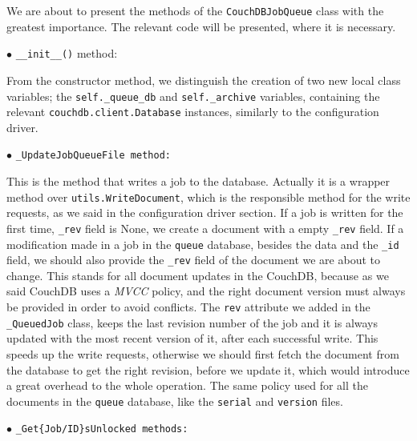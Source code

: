\begin{description}
    We are about to present the methods of the \texttt{CouchDBJobQueue} class
    with the greatest importance. The relevant code will be presented, where it
    is necessary.

    \bigskip
    $\bullet$ {\Large{\texttt{\_\_init\_\_()} method:}}

    From the constructor method, we distinguish the creation of two new local
    class variables; the \texttt{self.\_queue\_db} and \texttt{self.\_archive}
    variables, containing the relevant \texttt{couchdb.client.Database}
    instances, similarly to the configuration driver.

    \bigskip
    $\bullet$ {\Large{\texttt{\_UpdateJobQueueFile method:}}}

    This is the method that writes a job to the database. Actually it is a
    wrapper method over \texttt{utils.WriteDocument}, which is the
    responsible method for the write requests, as we said in the configuration
    driver section. If a job is written for the first time, \texttt{\_rev}
    field is None, we create a document with a empty \texttt{\_rev} field. If
    a modification made in a job in the \texttt{queue} database, besides the
    data and the \texttt{\_id} field, we should also provide the
    \texttt{\_rev} field of the document we are about to change. This stands for
    all document updates in the CouchDB, because as we said CouchDB uses a
    \emph{MVCC} policy, and the right document version must always be provided
    in order to avoid conflicts. The \texttt{rev} attribute we added in the
    \texttt{\_QueuedJob} class, keeps the last revision number of the job and it
    is always updated with the most recent version of it, after each successful
    write. This speeds up the write requests, otherwise we should first
    fetch the document from the database to get the right revision, before we
    update it, which would introduce a great overhead to the whole operation.
    The same policy used for all the documents in the \texttt{queue} database,
    like the \texttt{serial} and \texttt{version} files.

    \bigskip
    $\bullet$ {\Large{\texttt{\_Get\{Job/ID\}sUnlocked methods:}}}


\end{description}
